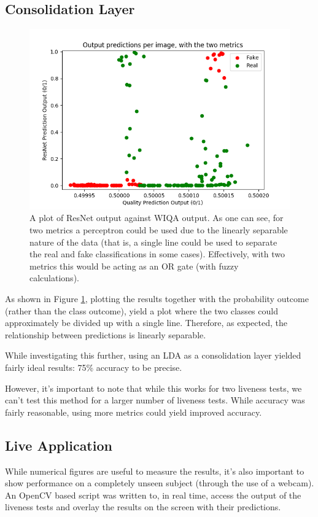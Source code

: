 \documentclass[10pt,a4paper]{article}
\begin{document}
    \subsection{Consolidation Layer}
        
        \begin{figure}
            \centering
            \includegraphics[width=.5\linewidth]{LinearlySeparable.png}
            \caption{A plot of ResNet output against WIQA output. As one can see, for two metrics a perceptron could be used due to the linearly separable nature of the data (that is, a single line could be used to
            separate the real and fake classifications in some cases). Effectively, with two metrics this would be acting as an OR gate (with fuzzy calculations).}
            \label{LinearlySeparableGraph}
        \end{figure}
    
        As shown in Figure \ref{LinearlySeparableGraph}, plotting the results together with the probability outcome (rather than the class outcome),
        yield a plot where the two classes could approximately be divided up with a single line. Therefore, as expected, the relationship between predictions is
        linearly separable.

        While investigating this further, using an LDA as a consolidation layer yielded fairly ideal results: 75\% accuracy to be precise. 

        However, it's important to note that while this works for two liveness tests, we can't test this method for a larger number of liveness tests. While accuracy was fairly reasonable,
        using more metrics could yield improved accuracy.

    \subsection{Live Application}
        While numerical figures are useful to measure the results, it's also important to show performance on a completely unseen subject (through the use of a webcam). An OpenCV based script was
        written to, in real time, access the output of the liveness tests and overlay the results on the screen with their predictions. 
\end{document}
